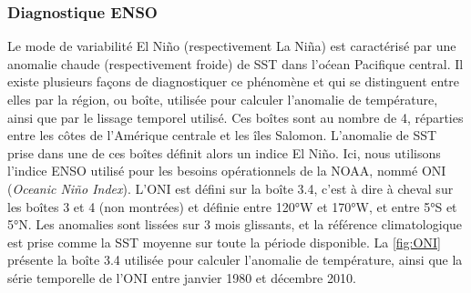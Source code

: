 \documentclass[../main.tex]{subfiles}
\begin{document}


\subsubsection{Diagnostique ENSO}\label{sec:diag_enso}

Le mode de variabilité El Niño (respectivement La Niña) est caractérisé par une anomalie chaude (respectivement froide) de SST dans l'oćean Pacifique central.
Il existe plusieurs façons de diagnostiquer ce phénomène et qui se distinguent entre elles par la région, ou boîte, utilisée pour calculer l'anomalie de
température, ainsi que par le lissage temporel utilisé. Ces boîtes sont au nombre de \num{4}, réparties entre les côtes de l'Amérique centrale et les îles
Salomon. L'anomalie de SST prise dans une de ces boîtes définit alors un indice El Niño. Ici, nous utilisons l'indice ENSO utilisé pour les besoins
opérationnels de la NOAA, nommé ONI (\textit{Oceanic Niño Index}). L'ONI est défini sur la boîte 3.4, c'est à dire à cheval sur les boîtes \num{3} et \num{4}
(non montrées) et définie entre \ang{120}W et \ang{170}W, et entre \ang{5}S et \ang{5}N. Les anomalies sont lissées sur \num{3} mois glissants, et la référence
climatologique est prise comme la SST moyenne sur toute la période disponible. La \cref{fig:ONI} présente la boîte 3.4 utilisée pour calculer l'anomalie de
température, ainsi que la série temporelle de l'ONI entre janvier \num{1980} et décembre \num{2010}.
\end{document}
